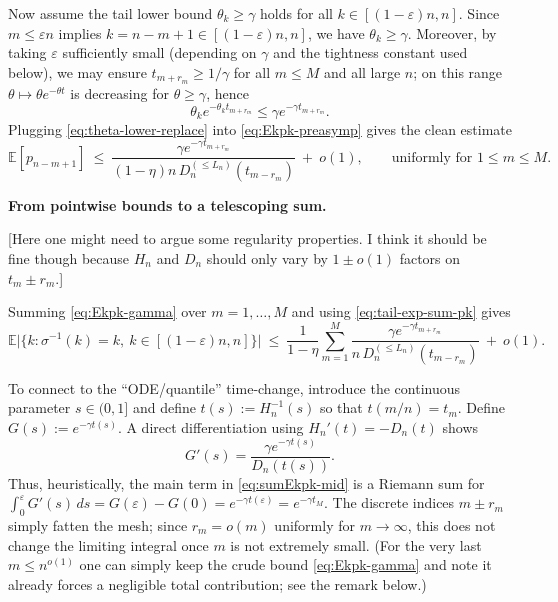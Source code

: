 \documentclass[10pt]{article}
\newcommand{\mscomment}[1]{\textup{\textsf{\color{red}[#1]}}}
\numberwithin{equation}{section}
\begin{document}
Now assume the tail lower bound $\theta_k\ge\gamma$ holds for all $k\in[(1-\varepsilon)n,n]$.
Since $m\le \varepsilon n$ implies $k=n-m+1\in[(1-\varepsilon)n,n]$, we have $\theta_k\ge\gamma$.
Moreover, by taking $\varepsilon$ sufficiently small (depending on $\gamma$ and the tightness constant used below),
we may ensure $t_{m+r_m}\ge 1/\gamma$ for all $m\le M$ and all large $n$; on this range
$\theta\mapsto \theta e^{-\theta t}$ is decreasing for $\theta\ge\gamma$, hence
\begin{equation}\label{eq:theta-lower-replace}
\theta_k e^{-\theta_k t_{m+r_m}} \le \gamma e^{-\gamma t_{m+r_m}}.
\end{equation}
Plugging \eqref{eq:theta-lower-replace} into \eqref{eq:Ekpk-preasymp} gives the clean estimate
\begin{equation}\label{eq:Ekpk-gamma}
\mathbb E[p_{n-m+1}]
\ \le\ \frac{\gamma e^{-\gamma t_{m+r_m}}}{(1-\eta)n\,D_n^{(\le L_n)}(t_{m-r_m})}
\ +\ o(1),
\qquad \text{uniformly for }1\le m\le M.
\end{equation}

\textbf{From pointwise bounds to a telescoping sum.}

\mscomment{Here one might need to argue some regularity properties. I think it should be fine though because $H_n$ and $D_n$ should only vary by $1\pm o(1)$ factors on $t_m\pm r_m$.}

Summing \eqref{eq:Ekpk-gamma} over $m=1,\dots,M$ and using \eqref{eq:tail-exp-sum-pk} gives
\begin{equation}\label{eq:sumEkpk-mid}
\mathbb E\big|\{k:\sigma^{-1}(k)=k,\ k\in[(1-\varepsilon)n,n]\}\big|
\ \le\ \frac{1}{1-\eta}\sum_{m=1}^{M}\frac{\gamma e^{-\gamma t_{m+r_m}}}{n\,D_n^{(\le L_n)}(t_{m-r_m})}
\ +\ o(1).
\end{equation}

To connect to the ``ODE/quantile'' time-change, introduce the continuous parameter $s\in(0,1]$ and define
$t(s):=H_n^{-1}(s)$ so that $t(m/n)=t_m$.
Define $G(s):=e^{-\gamma t(s)}$.
A direct differentiation using $H_n'(t)=-D_n(t)$ shows
\begin{equation}\label{eq:Gprime}
G'(s)=\frac{\gamma e^{-\gamma t(s)}}{D_n(t(s))}.
\end{equation}
Thus, heuristically, the main term in \eqref{eq:sumEkpk-mid} is a Riemann sum for
$\int_0^\varepsilon G'(s)\,ds = G(\varepsilon)-G(0)=e^{-\gamma t(\varepsilon)}=e^{-\gamma t_M}$.
The discrete indices $m\pm r_m$ simply fatten the mesh; since $r_m=o(m)$ uniformly for $m\to\infty$,
this does not change the limiting integral once $m$ is not extremely small.
(For the very last $m\le n^{o(1)}$ one can simply keep the crude bound \eqref{eq:Ekpk-gamma}
and note it already forces a negligible total contribution; see the remark below.)
\end{document}
